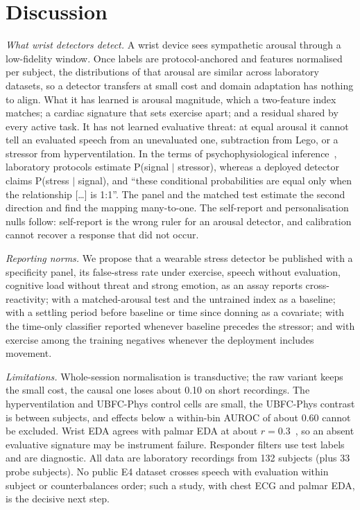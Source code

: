 \documentclass[journal]{IEEEtran}
\begin{document}
\section{Discussion}
\emph{What wrist detectors detect.} A wrist device sees sympathetic arousal through a low-fidelity window. Once labels are protocol-anchored and features normalised per subject, the distributions of that arousal are similar across laboratory datasets, so a detector transfers at small cost and domain adaptation has nothing to align. What it has learned is arousal magnitude, which a two-feature index matches; a cardiac signature that sets exercise apart; and a residual shared by every active task. It has not learned evaluative threat: at equal arousal it cannot tell an evaluated speech from an unevaluated one, subtraction from Lego, or a stressor from hyperventilation. In the terms of psychophysiological inference~\cite{cacioppo2007}, laboratory protocols estimate P(signal $\mid$ stressor), whereas a deployed detector claims P(stress $\mid$ signal), and ``these conditional probabilities are equal only when the relationship [\ldots] is 1:1''. The panel and the matched test estimate the second direction and find the mapping many-to-one. The self-report and personalisation nulls follow: self-report is the wrong ruler for an arousal detector, and calibration cannot recover a response that did not occur.

\emph{Reporting norms.} We propose that a wearable stress detector be published with a specificity panel, its false-stress rate under exercise, speech without evaluation, cognitive load without threat and strong emotion, as an assay reports cross-reactivity; with a matched-arousal test and the untrained index as a baseline; with a settling period before baseline or time since donning as a covariate; with the time-only classifier reported whenever baseline precedes the stressor; and with exercise among the training negatives whenever the deployment includes movement.

\emph{Limitations.} Whole-session normalisation is transductive; the raw variant keeps the small cost, the causal one loses about 0.10 on short recordings. The hyperventilation and UBFC-Phys control cells are small, the UBFC-Phys contrast is between subjects, and effects below a within-bin AUROC of about 0.60 cannot be excluded. Wrist EDA agrees with palmar EDA at about $r=0.3$~\cite{milstein2020}, so an absent evaluative signature may be instrument failure. Responder filters use test labels and are diagnostic. All data are laboratory recordings from 132 subjects (plus 33 probe subjects). No public E4 dataset crosses speech with evaluation within subject or counterbalances order; such a study, with chest ECG and palmar EDA, is the decisive next step.
\end{document}
